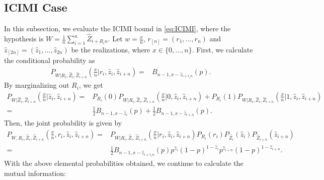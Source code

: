 \documentclass[onecolumn,romanappendices,10pt]{IEEEtran}
\begin{document}
	\subsection{ICIMI Case} \label{subapp:cal_ICIMI}
	\label{subsubsec: ICIMI-case}
	In this subsection, we evaluate the ICIMI bound in \eqref{eq:ICIMI}, where the hypothesis is $W = \frac{1}{n} \sum_{i=1}^{n} \hat{Z}_{i + R_i n}$. Let $w = \frac{x}{n}$, $r_{[n]} = (r_1, \ldots, r_n)$ and $\hat{z}_{[2n]} = (\hat{z}_1, \ldots, \hat{z}_{2n})$ be the realizations, where $x \in \{0, \ldots, n\}$. First, we calculate the conditional probability as
	\begin{equation}
		\begin{aligned}
			P_{W | R_i, \hat{Z}_{i}, \hat{Z}_{i+n}}(\frac{x}{n} | r_i, \hat{z}_{i}, \hat{z}_{i+n}) =& B_{n-1, x - \hat{z}_{i + r_i n}}(p).
		\end{aligned}
	\end{equation}
	By marginalizing out $R_i$, we get
	\begin{equation}
		\begin{aligned}
			P_{W | \hat{Z}_{i}, \hat{Z}_{i+n}}(\frac{x}{n} | \hat{z}_{i}, \hat{z}_{i+n}) =& P_{R_i}(0) P_{W | R_i, \hat{Z}_{i}, \hat{Z}_{i+n}}(\frac{x}{n} | 0, \hat{z}_{i}, \hat{z}_{i+n}) + P_{R_i}(1) P_{W | R_i, \hat{Z}_{i}, \hat{Z}_{i+n}}(\frac{x}{n} | 1, \hat{z}_{i}, \hat{z}_{i+n}) \\
			=& \frac{1}{2} B_{n-1, x - \hat{z}_{i}}(p) + \frac{1}{2} B_{n-1, x - \hat{z}_{i + n}}(p).
		\end{aligned}
	\end{equation}
	Then, the joint probability is given by
	\begin{equation} \label{eq:ICIMI_P_W_Ri_Zi_Zi+n}
		\begin{aligned}
			P_{W, R_i, \hat{Z}_{i}, \hat{Z}_{i+n}}(\frac{x}{n}, r_i, \hat{z}_{i}, \hat{z}_{i+n}) =& P_{W | R_i, \hat{Z}_{i}, \hat{Z}_{i+n}}(\frac{x}{n} | r_i, \hat{z}_{i}, \hat{z}_{i+n}) P_{R_i}(r_i) P_{\hat{Z}_{i}}(\hat{z}_{i}) P_{\hat{Z}_{i+n}} (\hat{z}_{i+n})\\
			=& \frac{1}{2} B_{n-1, x - \hat{z}_{i + r_i n}}(p) p^{\hat{z}_{i}} (1-p)^{1-\hat{z}_{i}} p^{\hat{z}_{i+n}} (1-p)^{1-\hat{z}_{i+n}}.
		\end{aligned}
	\end{equation}
	With the above elemental probabilities obtained, we continue to calculate the mutual information:
\end{document}

